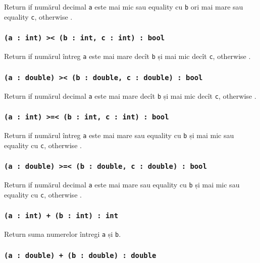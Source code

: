 Return \true{} if numărul decimal \texttt{a} este mai mic sau equality cu \texttt{b} ori mai mare sau equality \texttt{c}, otherwise \false{}.

\subsubsection{\texttt{(a : int) >< (b : int, c : int) : bool}}

Return \true{} if numărul întreg \texttt{a} este mai mare decît \texttt{b} și mai mic decît \texttt{c}, otherwise \false{}.

\subsubsection{\texttt{(a : double) >< (b : double, c : double) : bool}}

Return \true{} if numărul decimal \texttt{a} este mai mare decît \texttt{b} și mai mic decît \texttt{c}, otherwise \false{}.

\subsubsection{\texttt{(a : int) >=< (b : int, c : int) : bool}}

Return \true{} if numărul întreg \texttt{a} este mai mare sau equality cu \texttt{b} și mai mic sau equality cu \texttt{c}, otherwise \false{}.

\subsubsection{\texttt{(a : double) >=< (b : double, c : double) : bool}}

Return \true{} if numărul decimal \texttt{a} este mai mare sau equality cu \texttt{b} și mai mic sau equality cu \texttt{c}, otherwise \false{}.

\subsubsection{\texttt{(a : int) + (b : int) : int}}

Return suma numerelor întregi \texttt{a} și \texttt{b}.

\subsubsection{\texttt{(a : double) + (b : double) : double}}

